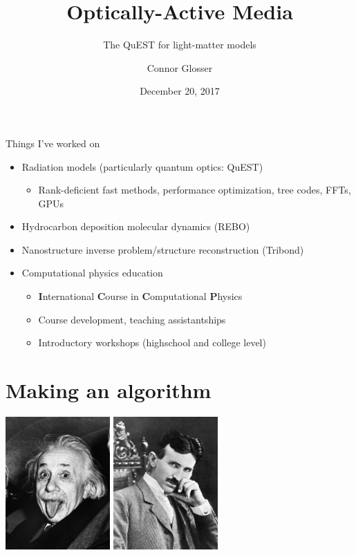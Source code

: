 \documentclass[aspectratio=169]{beamer}
\title{Optically-Active Media}
\subtitle{The QuEST for light-matter models}
\date{December 20, 2017}
\author{Connor Glosser}
\institute{Michigan State University}
\begin{document}
\maketitle

\begin{frame}{Things I've worked on}
  \begin{itemize}
    \item Radiation models (particularly quantum optics: QuEST)
      \begin{itemize}
        \item Rank-deficient fast methods, performance optimization, tree codes, FFTs, GPUs
      \end{itemize}
    \item Hydrocarbon deposition molecular dynamics (REBO)
    \item Nanostructure inverse problem/structure reconstruction (Tribond)
    \item Computational physics education
      \begin{itemize}
        \item \textbf{I}nternational \textbf{C}ourse in \textbf{C}omputational \textbf{P}hysics
        \item Course development, teaching assistantships
        \item Introductory workshops (highschool and college level)
      \end{itemize}
  \end{itemize}
\end{frame}

\section{Making an algorithm}

\begin{frame}
  \begin{center}
    \includegraphics[width=0.3\textwidth]{figures/einstein_tongue.jpg}
    \hspace{0.1cm}
    \includegraphics[width=0.3\textwidth]{figures/tesla_chair.jpg}
  \end{center}
\end{frame}
\end{document}
